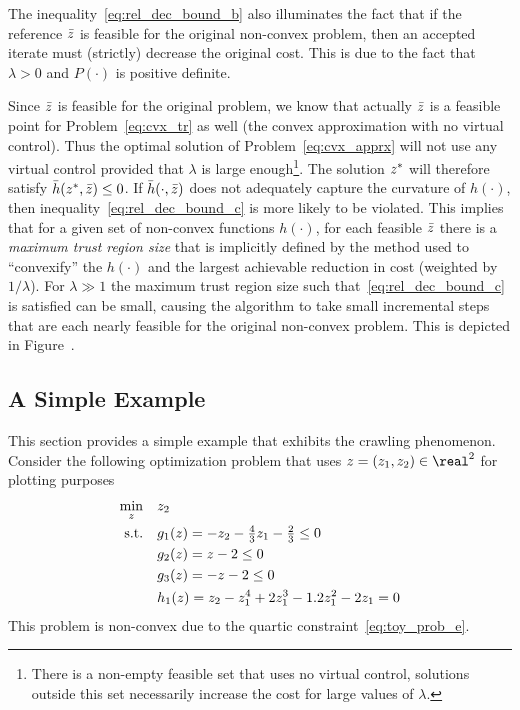 \documentclass[letterpaper, 10 pt, conference]{ieeeconf}
\begin{document}
\begin{remark}
The inequality~\eqref{eq:rel_dec_bound_b} also illuminates the fact that if the reference $\bar{z}$ is feasible for the original non-convex problem, then an accepted iterate must (strictly) decrease the original cost. This is due to the fact that $\lambda>0$ and $P(\cdot)$ is positive definite.
\end{remark}

Since $\bar{z}$ is feasible for the original problem, we know that actually $\bar{z}$ is a feasible point for Problem~\eqref{eq:cvx_tr} as well (the convex approximation with no virtual control). Thus the optimal solution of Problem~\eqref{eq:cvx_apprx} will not use any virtual control provided that $\lambda$ is large enough\footnote{There is a non-empty feasible set that uses no virtual control, solutions outside this set necessarily increase the cost for large values of $\lambda$.}. The solution $z^*$ will therefore satisfy $\bar{h}(z^*,\bar{z})\leq 0$. If $\bar{h}(\cdot,\bar{z})$ does not adequately capture the curvature of $h(\cdot)$, then inequality~\eqref{eq:rel_dec_bound_c} is more likely to be violated. This implies that for a given set of non-convex functions $h(\cdot)$, for each feasible $\bar{z}$ there is a \textit{maximum trust region size} that is implicitly defined by the method used to ``convexify'' the $h(\cdot)$ and the largest achievable reduction in cost (weighted by $1/\lambda$). For $\lambda\gg1$ the maximum trust region size such that~\eqref{eq:rel_dec_bound_c} is satisfied can be small, causing the algorithm to take small incremental steps that are each nearly feasible for the original non-convex problem. This is depicted in Figure~.

\subsection{A Simple Example}\label{subsec:toy_example}

This section provides a simple example that exhibits the crawling phenomenon. Consider the following optimization problem that uses $\z=(z_1,z_2)\in\real^2$ for plotting purposes
\begin{subequations}\label{eq:toy_prob}
\begin{align}
\min_z &\quad z_2 \label{eq:toy_prob_a}\\
\text{s.t.} &\quad g_1(z) = -z_2 - \tfrac{4}{3} z_1 - \tfrac{2}{3} \leq 0 \label{eq:toy_prob_b}\\
&\quad g_2(z) = z - 2 \leq 0 \label{eq:toy_prob_c}\\
&\quad g_3(z) = -z - 2 \leq 0 \label{eq:toy_prob_d}\\
&\quad h_1(z) = z_2 - z_1^4 + 2z_1^3 - 1.2z_1^2 - 2z_1 = 0 \label{eq:toy_prob_e}
\end{align}
\end{subequations}
This problem is non-convex due to the quartic constraint~\eqref{eq:toy_prob_e}.
\end{document}
